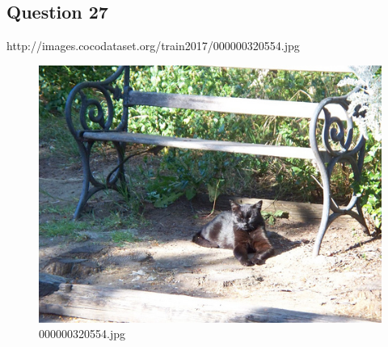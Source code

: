 \subsection*{Question 27}
http://images.cocodataset.org/train2017/000000320554.jpg
    \begin{figure}[h]
        \centering
        \includegraphics[width=0.8\linewidth]{../image set/easy/000000320554.jpg}
        \caption{000000320554.jpg}
    \end{figure}
